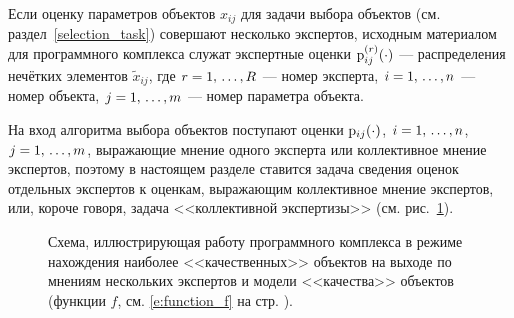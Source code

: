 \label{collective_global}


Если оценку параметров объектов $x_{ij}$ для задачи выбора объектов (см. раздел~\ref{selection_task}) совершают несколько экспертов, исходным материалом для программного комплекса служат экспертные оценки ${\mathrm{p}}^{(r)}_{ij}(\cdot)$ --- распределения нечётких элементов $\tilde x_{ij}$, где $r = 1,\, \ldots, R$ --- номер эксперта, $i = 1,\, \ldots, n$ --- номер объекта, $j = 1,\, \ldots, m$ --- номер параметра объекта.


На вход алгоритма выбора объектов поступают оценки ${\mathrm{p}}_{ij}(\cdot)$, $i = 1,\, \ldots, n$, $j = 1,\, \ldots, m$, выражающие мнение одного эксперта или коллективное мнение экспертов, поэтому в настоящем разделе ставится задача сведения оценок отдельных экспертов к оценкам, выражающим коллективное мнение экспертов, или, короче говоря, задача <<коллективной экспертизы>> (см. рис.~\ref{ris:program_global}).  %

\begin{figure}[h]
\caption{\small Схема, иллюстрирующая работу программного комплекса в режиме нахождения наиболее <<качественных>> объектов на выходе по мнениям нескольких экспертов и модели <<качества>> объектов (функции $f$, см. \eqref{e:function_f} на стр. \pageref{e:function_f}).}
\label{ris:program_global}
\end{figure}

